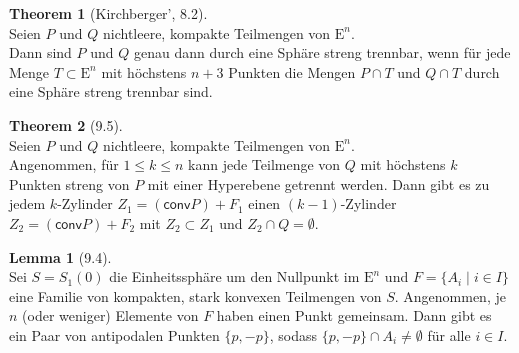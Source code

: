 \documentclass[a4paper,english,16pt]{scrartcl}
\newcommand{\E}{\text{E}} %
\newcommand{\conv}{\mathsf{conv}} %
\theoremstyle{definition}
\newtheorem*{theorem}{Theorem}
\newtheorem*{lemma}{Lemma}
\begin{document}
\onehalfspacing

\begin{framed}
  \begin{theorem}[Kirchberger', 8.2]\mbox{}\\
    Seien $P$ und $Q$ nichtleere, kompakte Teilmengen von $\E^n$. \\
    Dann sind $P$ und $Q$ genau dann durch eine Sphäre streng trennbar,
    wenn für jede Menge $T \subset \E^n$ mit höchstens $n + 3$ Punkten die Mengen $P \cap T$ und $Q \cap T$ durch eine Sphäre
    streng trennbar sind.
  \end{theorem}
\end{framed}

\vspace{96pt}

\begin{framed}
  \begin{theorem}[9.5]\mbox{}\\
    Seien $P$ und $Q$ nichtleere, kompakte Teilmengen von $\E^n$.\\
    Angenommen, für $1 \leq k \leq n$ kann jede Teilmenge von $Q$ mit höchstens $k$ Punkten streng von $P$ mit einer Hyperebene getrennt werden. Dann gibt es zu jedem $k$-Zylinder $Z_1 = (\conv P) + F_1$ einen $(k{-}1)$-Zylinder $Z_2 = (\conv P) + F_2$ mit $Z_2 \subset Z_1$ und $Z_2 \cap Q = \emptyset$.
  \end{theorem}
\end{framed}

\begin{framed}
  \begin{lemma}[9.4]\mbox{}\\
    Sei $S = S_1(0)$ die Einheitssphäre um den Nullpunkt im $\E^n$ und $F = \{ A_i \mid i \in I \}$ eine Familie von kompakten, stark konvexen Teilmengen von $S$. Angenommen, je $n$ (oder weniger) Elemente von $F$ haben einen Punkt gemeinsam. Dann gibt es ein Paar von antipodalen Punkten $\{ p, {-}p \}$, sodass $\{ p, {-}p \} \cap A_i \not= \emptyset$ für alle $i \in I$.
  \end{lemma}
\end{framed}

\newpage
\end{document}
